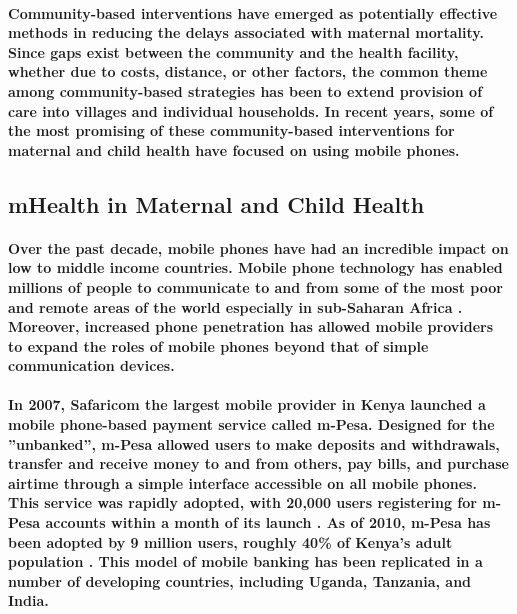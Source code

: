 \paragraph{Community-based interventions have emerged as potentially effective methods in reducing the delays associated with maternal mortality. Since gaps exist between the community and the health facility, whether due to costs, distance, or other factors, the common theme among community-based strategies has been to extend provision of care into villages and individual households. In recent years, some of the most promising of these community-based interventions for maternal and child health have focused on using mobile phones.}

\subsection{mHealth in Maternal and Child Health}
\paragraph{Over the past decade, mobile phones have had an incredible impact on low to middle income countries. Mobile phone technology has enabled millions of people to communicate to and from some of the most poor and remote areas of the world \textemdash   especially in sub-Saharan Africa \citep{Adler2007}. Moreover, increased phone penetration has allowed mobile providers to expand the roles of mobile phones  beyond that of simple communication devices.}

\paragraph{In 2007, Safaricom \textemdash  the largest mobile provider in Kenya \textemdash  launched a mobile phone-based payment service called m-Pesa. Designed for the ''unbanked'', m-Pesa allowed users to make deposits and withdrawals, transfer and receive money to and from others, pay bills, and purchase airtime through a simple interface accessible on all mobile phones. This service was rapidly adopted, with 20,000 users registering for m-Pesa accounts within a month of its launch \citep{Hughes2007}. As of 2010, m-Pesa has been adopted by 9 million users, roughly 40\% of Kenya's adult population \citep{Mas2010}. This model of mobile banking has been replicated in a number of developing countries, including Uganda, Tanzania, and India.}

